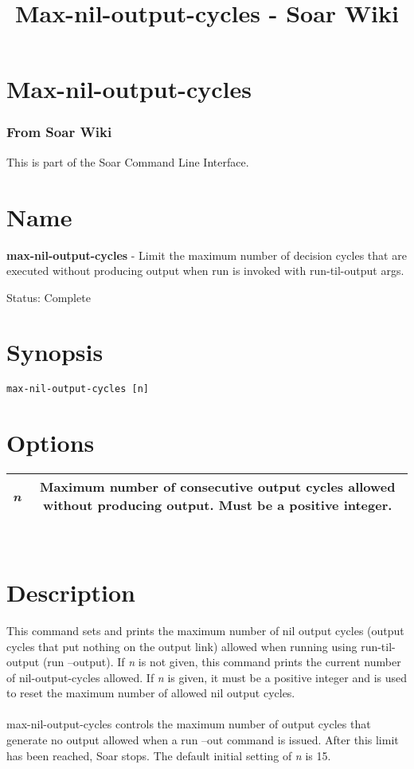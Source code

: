 \documentclass[10pt]{article}
\title{Max-nil-output-cycles - Soar Wiki}
\begin{document}
\section*{Max-nil-output-cycles}
\subsubsection*{From Soar Wiki}


 This is part of the Soar Command Line Interface. 
\section*{ Name }


 \textbf{max-nil-output-cycles}
 - Limit the maximum number of decision cycles that are executed without producing output when run is invoked with run-til-output args. 


 Status: Complete
\section*{ Synopsis }
\begin{verbatim}
max-nil-output-cycles [n]

\end{verbatim}
\section*{ Options }


\begin{tabular}{|c|c|}
\hline 
\emph{n}
 & Maximum number of consecutive output cycles allowed without producing output. Must be a positive integer.  \\
 \hline 

\end{tabular}



 \\ 

\section*{ Description }


 This command sets and prints the maximum number of nil output cycles (output cycles that put nothing on the output link) allowed when running using run-til-output (run --output). If \emph{n}
 is not given, this command prints the current number of nil-output-cycles allowed. If \emph{n}
 is given, it must be a positive integer and is used to reset the maximum number of allowed nil output cycles. \\ 
\\ 
max-nil-output-cycles controls the maximum number of output cycles that generate no output allowed when a run --out command is issued. After this limit has been reached, Soar stops. The default initial setting of \emph{n}
 is 15. 
\end{document}
